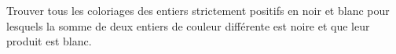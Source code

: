 Trouver tous les coloriages des entiers strictement positifs en noir et blanc pour lesquels la somme de deux entiers de couleur différente est noire et que leur produit est blanc.
